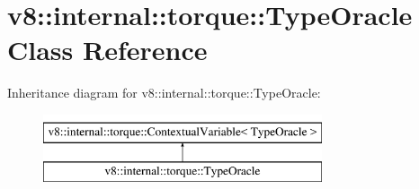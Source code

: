 \hypertarget{classv8_1_1internal_1_1torque_1_1TypeOracle}{}\section{v8\+:\+:internal\+:\+:torque\+:\+:Type\+Oracle Class Reference}
\label{classv8_1_1internal_1_1torque_1_1TypeOracle}
Inheritance diagram for v8\+:\+:internal\+:\+:torque\+:\+:Type\+Oracle\+:\begin{figure}[H]
\begin{center}
\leavevmode
\includegraphics[height=2.000000cm]{classv8_1_1internal_1_1torque_1_1TypeOracle}
\end{center}
\end{figure}

